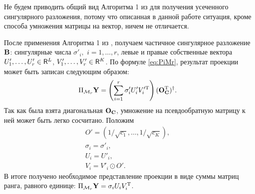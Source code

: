 \documentclass[12pt, specialist, subf,href,colorlinks=true,substylefile = spbu.rtx]{disser}
\theoremstyle{remark}
\theoremstyle{definition}
\begin{document}
Не будем приводить общий вид Алгоритма 1 из \cite{Korobeynikov2010} для получения усеченного сингулярного разложения, потому что описанная в данной работе ситуация, кроме способа умножения матрицы на вектор, ничем не отличается.

После применения Алгоритма 1 из \cite{Korobeynikov2010}, получаем частичное сингулярное разложение $\mathbf{B}$: сингулярные числа $\sigma'_i,$ $i = 1, \ldots, r$, левые и правые собственные вектора $U'_1, \ldots, U'_r \in \mathsf{R}^L$, $V'_1, \ldots, V'_r \in \mathsf{R}^K$. По формуле \eqref{eq:PiMr}, результат проекции может быть записан следующим образом:
\begin{equation*}
\Pi_{\mathcal{M}_r} \mathbf{Y} = \left(\sum\limits_{i=1}^r \sigma'_i U'_i V_i'^{\mathrm{T}}\right) (\mathbf{O}_{\mathbf{C}}^{\mathrm{T}})^\dagger.
\end{equation*}
Так как была взята диагональная $\mathbf{O}_{\mathbf{C}}$, умножение на псевдообратную матрицу к ней может быть легко сосчитано. Положим
\begin{gather*}
O' = (1/\sqrt{c_1}, \ldots, 1/\sqrt{c_K}), \\
\sigma_i = \sigma'_i, \\
U_i = U'_i, \\
V_i = V'_i \odot O'.
\end{gather*}
В итоге получено необходимое представление проекции в виде суммы матриц ранга, равного единице:
$\Pi_{\mathcal{M}_r} \mathbf{Y} = \sigma_i U_i V_i^{\mathrm{T}}$.
\end{document}
